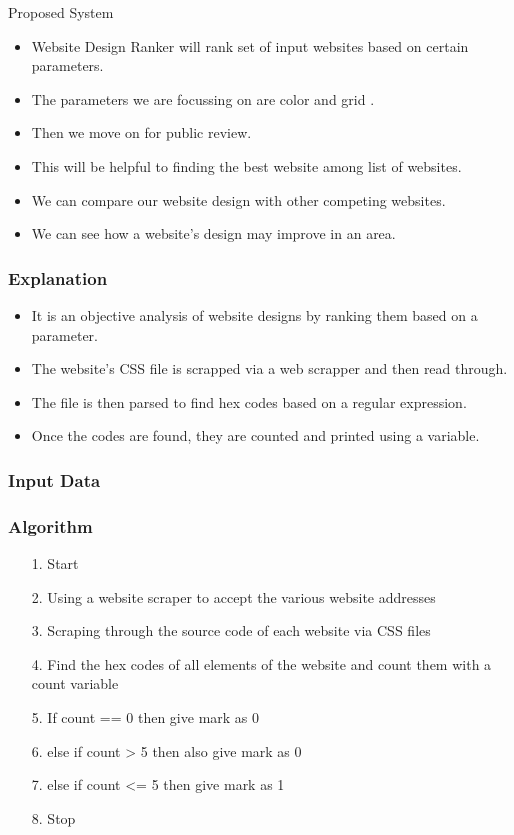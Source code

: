 \documentclass[11pt]{beamer}
\begin{document}
	\begin{frame}{Proposed System}
\begin{itemize}
	\item Website Design Ranker will rank set of input websites based on certain parameters.
	\item The parameters we are focussing on are color and grid .
	\item Then we move on for public review.
	\item This will be helpful to finding the best website among list of websites.
	\item We can compare our website design with other competing websites.
	\item We can see how a website's design may improve in an area.
	
\end{itemize}
\end{frame}
\begin{frame}
\frametitle{Explanation}
\begin{itemize}
	\item It is an objective analysis of website designs by ranking them based on a parameter.
	\item The website's CSS file is scrapped via a web scrapper and then read through.
	\item The file is then parsed to find hex codes based on a regular expression.
	\item Once the codes are found, they are counted and printed using a variable.
\end{itemize}
\end{frame}
\begin{frame}
\frametitle{Input Data}
\end{frame}
	\begin{frame}
	\frametitle{{Algorithm}}
	\begin{enumerate}
		\item[1.] Start
		\item[2.] Using a website scraper to accept the various website addresses
		\item[3.] Scraping through the source code of each website via CSS files
		\item[4.] Find the hex codes of all elements of the website and count them with a count variable
		\item[5.] If count == 0 then give mark as 0
		\item[6.] else if count > 5 then also give mark as 0
		\item[7.] else if count <= 5 then give mark as 1
		\item[8.] Stop
	\end{enumerate}
	
	\end{frame}
\end{document}
